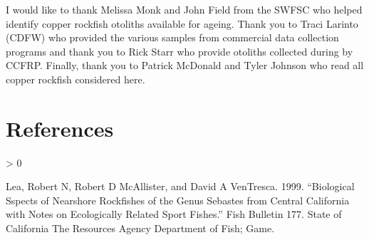 \documentclass[11pt,
  english,
  a4paper,
]{article}
\newlength{\cslhangindent}
\newenvironment{CSLReferences}[2] %
 {%
  \setlength{\parindent}{0pt}
  \ifodd #1 \everypar{\setlength{\hangindent}{\cslhangindent}}\ignorespaces\fi
  \ifnum #2 > 0
  \setlength{\parskip}{#2\baselineskip}
  \fi
 }%
 {}
\begin{document}
\leavevmode\tagmcend\tagstructend


I would like to thank Melissa Monk and John Field from the SWFSC who helped identify copper rockfish otoliths available for ageing. Thank you to Traci Larinto (CDFW) who provided the various samples from commercial data collection programs and thank you to Rick Starr who provide otoliths collected during by CCFRP. Finally, thank you to Patrick McDonald and Tyler Johnson who read all copper rockfish considered here.

\leavevmode\tagmcend\tagstructend\par

\clearpage


\hypertarget{references}{%
\section{References}\label{references}}

\leavevmode\tagmcend\tagstructend


\hypertarget{refs}{}
\begin{CSLReferences}{1}{0}
\leavevmode\hypertarget{ref-lea_biological_1999}{}%
Lea, Robert N, Robert D McAllister, and David A VenTresca. 1999. {``Biological Sspects of Nearshore Rockfishes of the Genus Sebastes from {Central} {California} with Notes on Ecologically Related Sport Fishes.''} Fish Bulletin 177. State of California The Resources Agency Department of Fish; Game.

\end{CSLReferences}

\leavevmode\tagmcend\tagstructend
\end{document}
